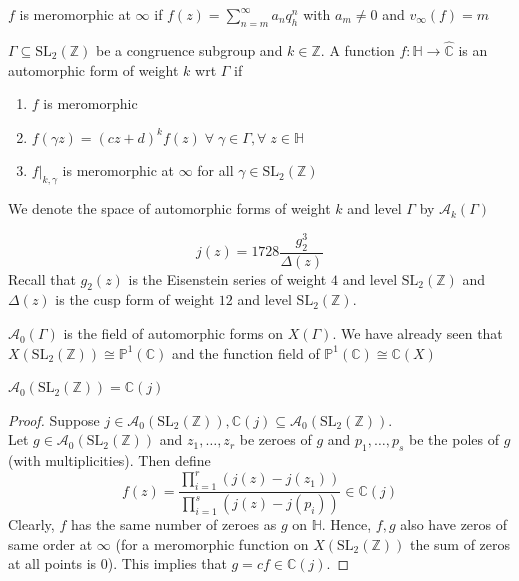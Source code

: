 \documentclass[oneside, 12pt]{scrbook}
\newcommand{\CC}{\mathbb C}
\newcommand{\ZZ}{\mathbb Z}
\newcommand{\PP}{\mathbb{P}}
\newcommand{\SL}{\mathrm{SL}}
\newcommand{\HH}{\mathbb{H}}
\theoremstyle{theorem}
\begin{document}
$f$ is meromorphic at $\infty$ if $f(z) = \sum_{n=m}^{\infty} a_{n}q_{h}^n$ with $a_{m} \neq 0$ and $v_{\infty}(f) = m$

\begin{definition}
$\Gamma \subseteq \SL_{2}(\ZZ)$ be a congruence subgroup and $k \in \ZZ$. A function $f: \HH \rightarrow \widehat{\CC}$ is an automorphic form  of weight $k$ wrt $\Gamma$ if 
\begin{enumerate}
\item $f$ is meromorphic 
\item $f(\gamma z) = (cz+d)^{k} f(z) \; \forall \; \gamma \in \Gamma , \forall \; z \in \HH$
\item $f|_{k, \gamma}$ is meromorphic at $\infty$ for all $\gamma \in \SL_{2}(\ZZ)$
\end{enumerate}

We denote the space of automorphic forms of weight $k$ and level $\Gamma$ by $\mathcal{A}_{k}(\Gamma)$
\end{definition}

\begin{example}
\begin{equation}
j(z)= 1728 \frac{g_{2}^3}{\Delta (z)}
\end{equation}
Recall that $g_{2}(z)$ is the Eisenstein series of weight $4$ and level $\SL_{2}(\ZZ)$ and $\Delta (z)$ is the cusp form of weight $12$ and level $\SL_{2}(\ZZ)$. 
\end{example}

$\mathcal{A}_{0}(\Gamma)$ is the field of automorphic forms on $X(\Gamma)$. We have already seen that $X(\SL_{2}(\ZZ)) \cong \PP^1 (\CC)$ and the function field of $\PP^1 (\CC) \cong \CC(X)$

\begin{proposition}
$\mathcal{A}_{0}(\SL_{2}(\ZZ)) = \CC(j)$
\end{proposition}

\begin{proof}
Suppose $j \in \mathcal{A}_{0}(\SL_{2}(\ZZ)), \CC(j) \subseteq \mathcal{A}_{0} (\SL_{2}(\ZZ))$. \\
Let $g \in \mathcal{A}_{0}(\SL_{2}(\ZZ))$ and $z_{1}, \hdots , z_{r}$ be zeroes of $g$ and $p_{1}, \hdots , p_{s}$ be the poles of $g$ (with multiplicities). Then define $$f(z) = \frac{\prod_{i=1}^r (j(z) - j(z_{1}))}{\prod_{i=1}^s (j(z) - j(p_{i}))} \in \CC(j)$$
Clearly, $f$ has the same number of zeroes as $g$ on $\HH$. Hence, $f,g$ also have zeros of same order at $\infty$ (for a meromorphic function on $X(\SL_{2}(\ZZ))$ the sum of zeros at all points is $0$). This implies that $g=cf \in \CC(j)$.
\end{proof}
\end{document}
